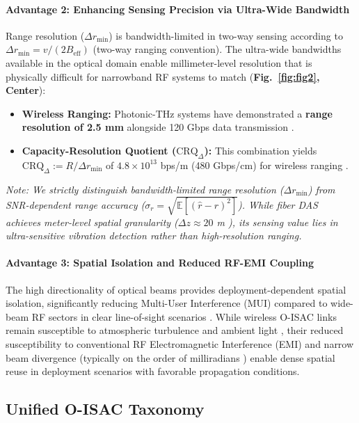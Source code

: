\documentclass[lettersize,journal]{IEEEtran}
\begin{document}
\paragraph{Advantage 2: Enhancing Sensing Precision via Ultra-Wide Bandwidth}
Range resolution ($\Delta r_{\min}$) is bandwidth-limited in two-way sensing according to $\Delta r_{\min} = v/(2B_{\text{eff}})$ (two-way ranging convention). The ultra-wide bandwidths available in the optical domain enable millimeter-level resolution that is physically difficult for narrowband RF systems to match (\textbf{Fig.~\ref{fig:fig2}, Center}):
\begin{itemize}
    \item \textbf{Wireless Ranging:} Photonic-THz systems have demonstrated a \textbf{range resolution of 2.5 mm} alongside 120 Gbps data transmission \cite{O_ISAC_105}.
    \item \textbf{Capacity-Resolution Quotient ($\text{CRQ}_{\Delta}$):} This combination yields $\text{CRQ}_{\Delta} := R / \Delta r_{\min}$ of $4.8\times10^{13}$ bps/m (480 Gbps/cm) for wireless ranging \cite{O_ISAC_105}.
\end{itemize}
\textit{Note: We strictly distinguish bandwidth-limited range resolution ($\Delta r_{\min}$) from SNR-dependent range accuracy ($\sigma_r = \sqrt{\mathbb{E}[(\hat r - r)^2]}$). While fiber DAS achieves meter-level spatial granularity ($\Delta z \approx 20$ m \cite{O_ISAC_046}), its sensing value lies in ultra-sensitive vibration detection rather than high-resolution ranging.}

\paragraph{Advantage 3: Spatial Isolation and Reduced RF-EMI Coupling}
The high directionality of optical beams provides deployment-dependent spatial isolation, significantly reducing Multi-User Interference (MUI) compared to wide-beam RF sectors in clear line-of-sight scenarios \cite{O_ISAC_021}. While wireless O-ISAC links remain susceptible to atmospheric turbulence and ambient light \cite{O_ISAC_003}, their reduced susceptibility to conventional RF Electromagnetic Interference (EMI) and narrow beam divergence (typically on the order of milliradians \cite{O_ISAC_021}) enable dense spatial reuse in deployment scenarios with favorable propagation conditions.


\subsection{Unified O-ISAC Taxonomy}
\end{document}
